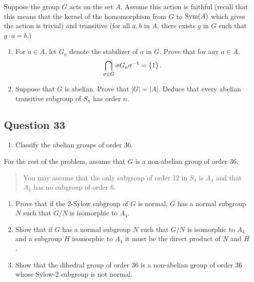 \documentclass[12pt]{article}
\providecommand{\tightlist}{%
  \setlength{\itemsep}{0pt}\setlength{\parskip}{0pt}}
\begin{document}
Suppose the group \(G\) acts on the set \(A\). Assume this action is
faithful (recall that this means that the kernel of the homomorphism
from \(G\) to \(\mathrm{Sym}(A)\) which gives the action is trivial) and
transitive (for all \(a, b\) in \(A\), there exists \(g\) in \(G\) such
that \(g \cdot a = b\).)

\begin{enumerate}
\def\labelenumi{(\alph{enumi})}
\item
  For \(a \in A\), let \(G_a\) denote the stabilizer of \(a\) in \(G\).
  Prove that for any \(a \in A\), \[
  \bigcap_{\sigma\in G} \sigma G_a \sigma^{-1} = \left\{{1}\right\}
  .\]
\item
  Suppose that \(G\) is abelian. Prove that \(|G| = |A|\). Deduce that
  every abelian transitive subgroup of \(S_n\) has order \(n\).
\end{enumerate}

\hypertarget{question-33}{%
\subsection{Question 33}\label{question-33}}

\begin{enumerate}
\def\labelenumi{(\alph{enumi})}
\tightlist
\item
  Classify the abelian groups of order 36.
\end{enumerate}

For the rest of the problem, assume that \(G\) is a non-abelian group of
order 36.

\begin{quote}
You may assume that the only subgroup of order 12 in \(S_4\) is \(A_4\)
and that \(A_4\) has no subgroup of order 6.
\end{quote}

\begin{enumerate}
\def\labelenumi{(\alph{enumi})}
\setcounter{enumi}{1}
\item
  Prove that if the 2-Sylow subgroup of \(G\) is normal, \(G\) has a
  normal subgroup \(N\) such that \(G/N\) is isomorphic to \(A_4\).
\item
  Show that if \(G\) has a normal subgroup \(N\) such that \(G/N\) is
  isomorphic to \(A_4\) and a subgroup \(H\) isomorphic to \(A_4\) it
  must be the direct product of \(N\) and \(H\).
\item
  Show that the dihedral group of order 36 is a non-abelian group of
  order 36 whose Sylow-2 subgroup is not normal.
\end{enumerate}
\end{document}
